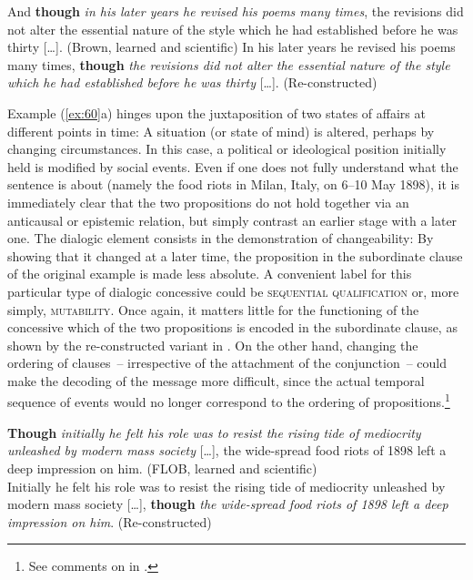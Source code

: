 \ea\label{ex:59}
  \ea\label{bkm:Ref487279631}  And \textbf{though} \textit{in his later years he revised his poems many times}, the revisions did not alter the essential nature of the style which he had established before he was thirty […]. (Brown, learned and scientific)
  \ex\label{ex:59b} In his later years he revised his poems many times, \textbf{though} \textit{the revisions did not alter the essential nature of the style which he had established before he was thirty} […]. (Re-constructed)
  \z
\z

Example (\ref{ex:60}a) hinges upon the juxtaposition of two states of affairs at different points in time: A situation (or state of mind) is altered, perhaps by changing circumstances. In this case, a political or ideological position initially held is modified by social events. Even if one does not fully understand what the sentence is about (namely the food riots in Milan, Italy, on 6–10 May 1898), it is immediately clear that the two propositions do not hold together via an anticausal or epistemic relation, but simply contrast an earlier stage with a later one. The dialogic element consists in the demonstration of changeability: By showing that it changed at a later time, the proposition in the subordinate clause of the original example is made less absolute. A convenient label for this particular type of dialogic concessive could be \textsc{sequential qualification} or, more simply, \textsc{mutability}. Once again, it matters little for the functioning of the concessive which of the two propositions is encoded in the subordinate clause, as shown by the re-constructed variant in . On the other hand, changing the ordering of clauses~– irrespective of the attachment of the conjunction~– could make the decoding of the message more difficult, since the actual temporal sequence of events would no longer correspond to the ordering of propositions.\footnote{See comments on  in .}

\ea\label{ex:60}
    \ea\label{bkm:Ref487634220}\textbf{Though} \textit{initially he felt his role was to resist the rising tide of mediocrity unleashed by modern mass society} […], the wide-spread food riots of 1898 left a deep impression on him. (FLOB, learned and scientific)\\
    \ex\label{ex:60b}Initially he felt his role was to resist the rising tide of mediocrity unleashed by modern mass society […], \textbf{though} \textit{the wide-spread food riots of 1898 left a deep impression on him}. (Re-constructed)\\
\z
\z


